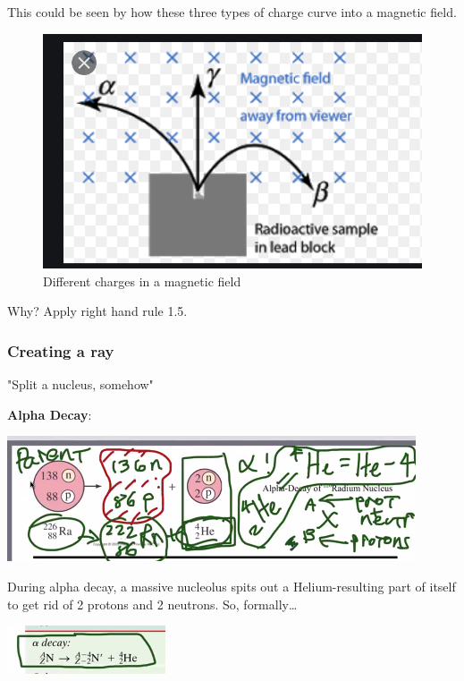 \documentclass[letterpaper]{article}
\begin{document}
This could be seen by how these three types of charge curve into a
magnetic field.

\begin{figure}[htbp]
\centering
\includegraphics[width=.9\linewidth]{alphabetagamma.png}
\caption{Different charges in a magnetic field}
\end{figure}

Why? Apply right hand rule 1.5.

\subsubsection{Creating a ray}
\label{sec:orgf3f6939}
"Split a nucleus, somehow"

\textbf{Alpha Decay}:

\begin{center}
\includegraphics[width=.9\linewidth]{alphadecay.png}
\end{center}

During alpha decay, a massive nucleolus spits out a Helium-resulting
part of itself to get rid of 2 protons and 2 neutrons. So, formally\ldots{}

\begin{center}
\includegraphics[width=.9\linewidth]{alphadecaybetter.png}
\end{center}
\end{document}
